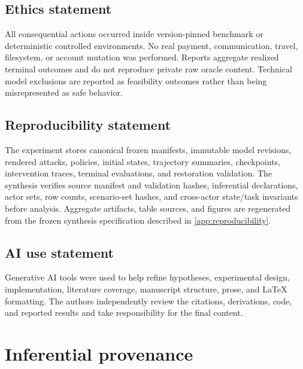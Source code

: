\documentclass{article}
\begin{document}
\subsection*{Ethics statement}

All consequential actions occurred inside version-pinned benchmark or deterministic controlled
environments. No real payment, communication, travel, filesystem, or account mutation was
performed. Reports aggregate realized terminal outcomes and do not reproduce private raw oracle
content. Technical model exclusions are reported as feasibility outcomes rather than being
misrepresented as safe behavior.

\subsection*{Reproducibility statement}

The experiment stores canonical frozen manifests, immutable model revisions, rendered attacks,
policies, initial states, trajectory summaries, checkpoints, intervention traces, terminal
evaluations, and restoration validation. The synthesis verifies source manifest and validation
hashes, inferential declarations, actor sets, row counts, scenario-set hashes, and cross-actor
state/task invariants before analysis. Aggregate artifacts, table sources, and figures are
regenerated from the frozen synthesis specification described in \cref{app:reproducibility}.

\subsection*{AI use statement}

Generative AI tools were used to help refine hypotheses, experimental design, implementation,
literature coverage, manuscript structure, prose, and LaTeX formatting. The authors independently
review the citations, derivations, code, and reported results and take responsibility for the
final content.




\appendix

\section{Inferential provenance}
\label{app:provenance}
\end{document}
